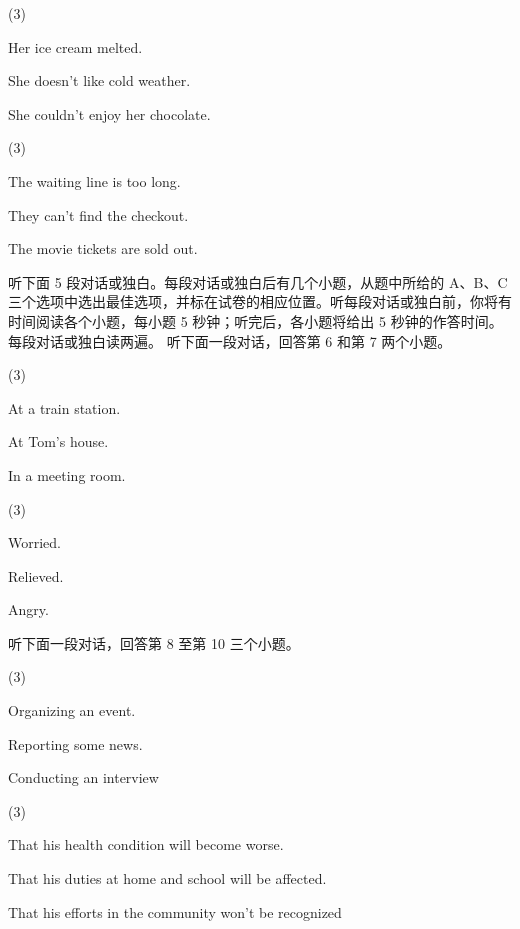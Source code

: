 \documentclass{英语试卷}
\begin{document}
\begin{choices}(3)
  \item Her ice cream melted.
  \item She doesn't like cold weather.
  \item She couldn't enjoy her chocolate.
\end{choices}
\begin{choices}(3)
  \item The waiting line is too long.
  \item They can't find the checkout.
  \item The movie tickets are sold out.
\end{choices}
\par 听下面 5 段对话或独白。每段对话或独白后有几个小题，从题中所给的 A、B、C 三个选项中选出最佳选项，并标在试卷的相应位置。听每段对话或独白前，你将有时间阅读各个小题，每小题 5 秒钟；听完后，各小题将给出 5 秒钟的作答时间。每段对话或独白读两遍。 听下面一段对话，回答第 6 和第 7 两个小题。\par
{}
\begin{choices}(3)
  \item At a train station.
  \item At Tom's house.
  \item In a meeting room.
\end{choices}
\begin{choices}(3)
  \item Worried.
  \item Relieved.
  \item Angry.
\end{choices}
\par 听下面一段对话，回答第 8 至第 10 三个小题。\par
{}
\begin{choices}(3)
  \item Organizing an event.
  \item Reporting some news.
  \item Conducting an interview
\end{choices}
\begin{choices}(3)
  \item That his health condition will become worse.
  \item That his duties at home and school will be affected.
  \item That his efforts in the community won't be recognized
\end{choices}
\end{document}
